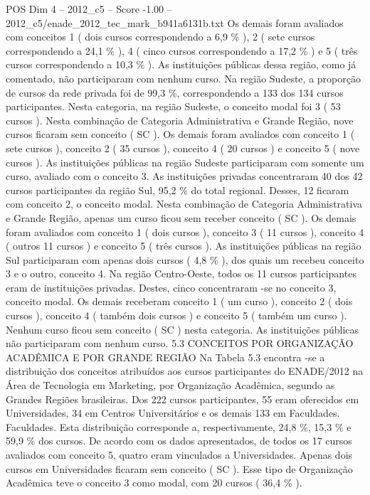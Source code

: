 \begin{textsample}{POS Dim 4 – 2012\_c5 – Score -1.00 – 2012\_c5/enade\_2012\_tec\_mark\_b941a6131b.txt}
Os demais foram avaliados com conceitos 1 ( dois cursos correspondendo a 6,9 \% ), 2 ( sete cursos correspondendo a 24,1 \% ), 4 ( cinco cursos correspondendo a 17,2 \% ) e 5 ( três cursos correspondendo a 10,3 \% ).
As instituições públicas dessa região, como já comentado, não participaram com nenhum curso.
Na região Sudeste, a proporção de cursos da rede privada foi de 99,3 \%, correspondendo a 133 dos 134 cursos participantes.
Nesta categoria, na região Sudeste, o conceito modal foi 3 ( 53 cursos ).
Nesta combinação de Categoria Administrativa e Grande Região, nove cursos ficaram sem conceito ( SC ).
Os demais foram avaliados com conceito 1 ( sete cursos ), conceito 2 ( 35 cursos ), conceito 4 ( 20 cursos ) e conceito 5 ( nove cursos ).
As instituições públicas na região Sudeste participaram com somente um curso, avaliado com o conceito 3.
As instituições privadas concentraram 40 dos 42 cursos participantes da região Sul, 95,2 \% do total regional.
Desses, 12 ficaram com conceito 2, o conceito modal.
Nesta combinação de Categoria Administrativa e Grande Região, apenas um curso ficou sem receber conceito ( SC ).
Os demais foram avaliados com conceito 1 ( dois cursos ), conceito 3 ( 11 cursos ), conceito 4 ( outros 11 cursos ) e conceito 5 ( três cursos ).
As instituições públicas na região Sul participaram com apenas dois cursos ( 4,8 \% ), dos quais um recebeu conceito 3 e o outro, conceito 4.
Na região Centro-Oeste, todos os 11 cursos participantes eram de instituições privadas.
Destes, cinco concentraram -se no conceito 3, conceito modal.
Os demais receberam conceito 1 ( um curso ), conceito 2 ( dois cursos ), conceito 4 ( também dois cursos ) e conceito 5 ( também um curso ).
Nenhum curso ficou sem conceito ( SC ) nesta categoria.
As instituições públicas não participaram com nenhum curso. 5.3 CONCEITOS POR ORGANIZAÇÃO ACADÊMICA E POR GRANDE REGIÃO Na Tabela 5.3 encontra -se a distribuição dos conceitos atribuídos aos cursos participantes do ENADE/2012 na Área de Tecnologia em Marketing, por Organização Acadêmica, segundo as Grandes Regiões brasileiras.
Dos 222 cursos participantes, 55 eram oferecidos em Universidades, 34 em Centros Universitários e os demais 133 em Faculdades.
Faculdades.
Esta distribuição corresponde a, respectivamente, 24,8 \%, 15,3 \% e 59,9 \% dos cursos.
De acordo com os dados apresentados, de todos os 17 cursos avaliados com conceito 5, quatro eram vinculados a Universidades.
Apenas dois cursos em Universidades ficaram sem conceito ( SC ).
Esse tipo de Organização Acadêmica teve o conceito 3 como modal, com 20 cursos ( 36,4 \% ).

\end{textsample}
